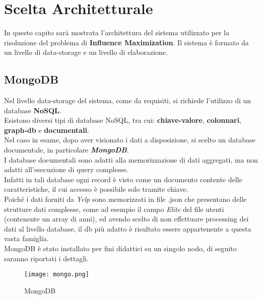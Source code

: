 
\chapter{Scelta Architetturale}
In questo capito sarà mostrata l'architettura del sistema utilizzato per
la risoluzione del problema di \textbf{Influence Maximization}. Il sistema è formato da un
livello di data-storage e un livello di elaborazione.

\section{MongoDB}
Nel livello data-storage del sistema, come da requisiti, si richiede l'utilizzo di un database
\textbf{NoSQL}.\\
Esistono diversi tipi di database NoSQL, tra cui: \textbf{chiave-valore}, \textbf{colonnari},
\textbf{graph-db} e \textbf{documentali}.\\
Nel caso in esame, dopo aver visionato i dati a disposizione, si scelto
un database documentale, in particolare \textit{\textbf{MongoDB}}.\\
I database documentali sono adatti alla memorizzazione di dati aggregati, ma non
adatti all'esecuzione di query complesse.\\
Infatti in tali database ogni record è visto come un documento contente delle
caratteristiche, il cui accesso è possibile
solo tramite chiave.\\
Poiché i dati forniti da \textit{Yelp} sono memorizzati in file .json che presentano
delle strutture dati complesse, come ad esempio il campo \textit{Elite} del file
utenti (contenente un array di anni), ed avendo scelto
di non effettuare processing dei dati al livello database, il db più adatto è
risultato essere appartenente a questa vasta famiglia.\\
MongoDB è stato installato per fini didattici su un singolo nodo, di seguito
saranno riportati i dettagli.

\begin{figure}[!htbp]
	\texttt{[image: mongo.png]}
  \caption{MongoDB}
  \label{}
\end{figure}

